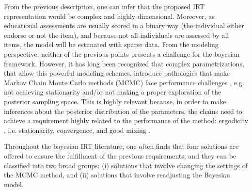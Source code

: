 From the previous description, one can infer that the proposed IRT representation would be complex and highly dimensional. Moreover, as educational assessments are usually scored in a binary way (the individual either endorse or not the item), and because not all individuals are assessed by all items, the model will be estimated with sparse data. From the modeling perspective, neither of the previous points presents a challenge for the bayesian framework. However, it has long been recognized that complex parametrizations, that allow this powerful modeling schemes, introduce pathologies that make Markov Chain Monte Carlo methods (MCMC)  face performance challenges \cite{Gelfand_et_al_1995, Gelfand_et_al_1996, Papaspiliopoulos_et_al_2003, Papaspiliopoulos_et_al_2007, Betancourt_et_al_2013}, e.g. not achieving stationarity and/or not making a proper exploration of the posterior sampling space. This is highly relevant because, in order to make inferences about the posterior distribution of the parameters, the chains need to achieve a requirement highly related to the performance of the method: ergodicity \cite{Metropolis_et_al_1953}, i.e. stationarity, convergence, and good mixing \cite{McElreath_2020}.

Throughout the bayesian IRT literature, one often finds that four solutions are offered to ensure the fulfillment of the previous requirements, and they can be classified into two broad groups: (i) solutions that involve changing the settings of the MCMC method, and (ii) solutions that involve readjusting the Bayesian model. 

